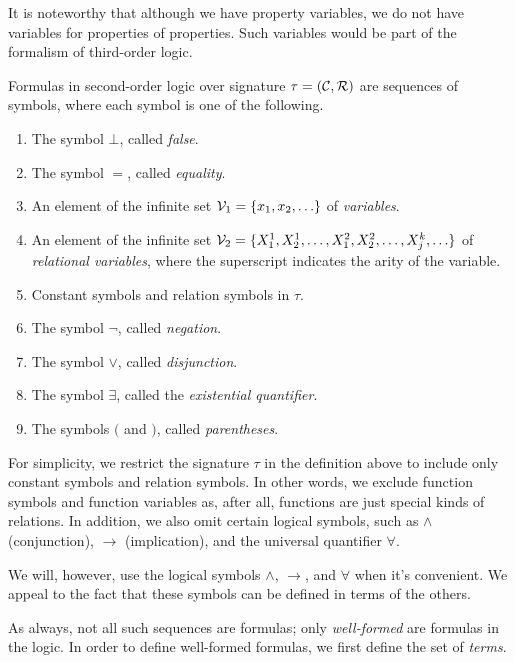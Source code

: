 \documentclass[11pt,twoside=off,numbers=noenddot]{scrbook}
\begin{document}
\begin{remark}
  It is noteworthy that although we have property variables, we do not have variables for properties of properties. Such variables would be part of the formalism of third-order logic.
\end{remark}

Formulas in second-order logic over signature $\tau = (\mathcal{C}, \mathcal{R})$ are sequences of symbols, where each symbol is one of the following.
\begin{enumerate}
  \item The symbol $\bot$, called \emph{false}.
  \item The symbol $=$, called \emph{equality}.
  \item An element of the infinite set $\vars_1 = \set{x_1, x_2, \dots}$ of \emph{variables}.
  \item An element of the infinite set $\vars_2 = \set{X_1^1, X_2^1, \dots, X_1^2, X_2^2, \dots, X_j^k, \dots}$ of \emph{relational variables}, where the superscript indicates the arity of the variable.
  \item Constant symbols and relation symbols in $\tau$.
  \item The symbol $\neg$, called \emph{negation}.
  \item The symbol $\vee$, called \emph{disjunction}.
  \item The symbol $\exists$, called the \emph{existential quantifier}.
  \item The symbols $($ and $)$, called \emph{parentheses}.
\end{enumerate}

\begin{remark}
  For simplicity, we restrict the signature $\tau$ in the definition above to include only constant symbols and relation symbols. In other words, we exclude function symbols and function variables as, after all, functions are just special kinds of relations. In addition, we also omit certain logical symbols, such as $\wedge$ (conjunction), $\rightarrow$ (implication), and the universal quantifier $\forall$.
\end{remark}

\begin{abuse}
  We will, however, use the logical symbols $\wedge$, $\rightarrow$, and $\forall$ when it's convenient. We appeal to the fact that these symbols can be defined in terms of the others.
\end{abuse}

As always, not all such sequences are formulas; only \emph{well-formed} are formulas in the logic. In order to define well-formed formulas, we first define the set of \emph{terms}.
\end{document}
